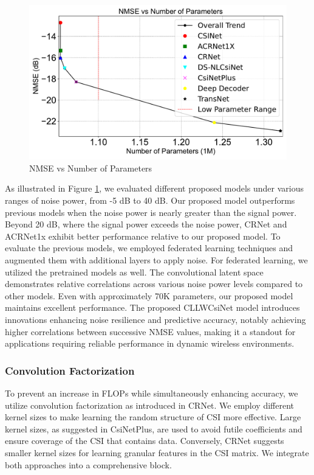 \documentclass[lettersize,journal]{IEEEtran}
\begin{document}
\begin{figure}[t]
	\centering
	\includegraphics[width=\columnwidth]{NMSEvsNofparametters.pdf}
	\caption{NMSE vs Number of Parameters}
	\label{fig:nmse-params}
\end{figure}

As illustrated in Figure \ref{fig:nmse-params}, we evaluated different proposed models under various ranges of noise power, from -5 dB to 40 dB. Our proposed model outperforms previous models when the noise power is nearly greater than the signal power. Beyond 20 dB, where the signal power exceeds the noise power, CRNet \cite{abn} and ACRNet1x \cite{abx} exhibit better performance relative to our proposed model. To evaluate the previous models, we employed federated learning techniques and augmented them with additional layers to apply noise. For federated learning, we utilized the pretrained models as well. The convolutional latent space demonstrates relative correlations across various noise power levels compared to other models. Even with approximately 70K parameters, our proposed model maintains excellent performance. The proposed CLLWCsiNet model introduces innovations enhancing noise resilience and predictive accuracy, notably achieving higher correlations between successive NMSE values, making it a standout for applications requiring reliable performance in dynamic wireless environments.


\subsubsection{Convolution Factorization} To prevent an increase in FLOPs while simultaneously enhancing accuracy, we utilize convolution factorization as introduced in CRNet\cite{abn}. We employ different kernel sizes to make learning the random structure of CSI more effective. Large kernel sizes, as suggested in CsiNetPlus\cite{abo}, are used to avoid futile coefficients and ensure coverage of the CSI that contains data. Conversely, CRNet\cite{abn} suggests smaller kernel sizes for learning granular features in the CSI matrix. We integrate both approaches into a comprehensive block.
\end{document}
